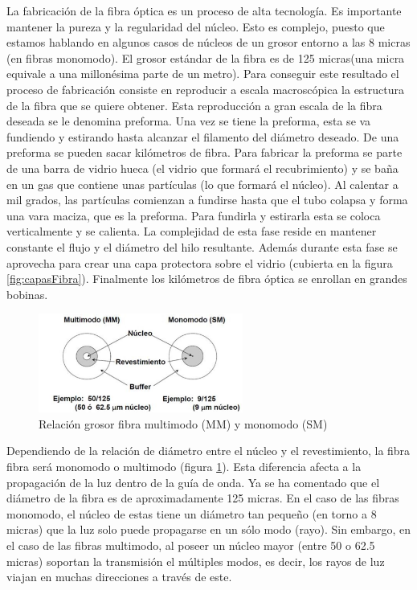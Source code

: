 \begin{itemize}
 La fabricación de la fibra óptica es un proceso de alta tecnología. Es importante mantener la pureza y la regularidad del núcleo. Esto es complejo, puesto que estamos hablando en algunos casos de núcleos de un grosor entorno a las 8 micras (en fibras monomodo). El grosor estándar de la fibra es de 125 micras(una micra equivale a una millonésima parte de un metro). Para conseguir este resultado el proceso de fabricación consiste en reproducir a escala macroscópica la estructura de la fibra que se quiere obtener. Esta reproducción a gran escala de la fibra deseada se le denomina preforma. Una vez se tiene la preforma, esta se va fundiendo y estirando hasta alcanzar el filamento del diámetro deseado. De una preforma se pueden sacar kilómetros de fibra. Para fabricar la preforma se parte de una barra de vidrio hueca (el vidrio que formará el recubrimiento) y se baña en un gas que contiene unas partículas (lo que formará el núcleo). Al calentar a mil grados, las partículas comienzan a fundirse hasta que el tubo colapsa y forma una vara maciza, que es la preforma. Para fundirla y estirarla esta se coloca verticalmente y se calienta. La complejidad de esta fase reside en mantener constante el flujo y el diámetro del hilo resultante. Además durante esta fase se aprovecha para crear una capa protectora sobre el vidrio (cubierta en la figura \ref{fig:capasFibra}). Finalmente los kilómetros de fibra óptica se enrollan en grandes bobinas. \cite{fabricacionFO}
 
  \begin{figure}[H]
 	\centering
 	\includegraphics[width=0.6\textwidth]{./img/MM-SM}
 	\caption{Relación grosor fibra multimodo (MM) y monomodo (SM) \cite{imgRadioModo} } 
 	\label{fig:modoMonoMulti}
 \end{figure} 
 
  Dependiendo de la relación de diámetro entre el núcleo y el revestimiento, la fibra fibra será monomodo o multimodo (figura \ref{fig:modoMonoMulti}). Esta diferencia afecta a la propagación de la luz dentro de la guía de onda. Ya se ha comentado que el diámetro de la fibra es de aproximadamente 125 micras. En el caso de las fibras monomodo, el núcleo de estas tiene un diámetro tan pequeño (en torno a 8 micras) que la luz solo puede propagarse en un sólo modo (rayo). Sin embargo, en el caso de las fibras multimodo, al poseer un núcleo mayor (entre 50 o 62.5 micras) soportan la transmisión el múltiples modos, es decir, los rayos de luz viajan en muchas direcciones a través de este. \cite{FOA} 
   

\end{itemize}
